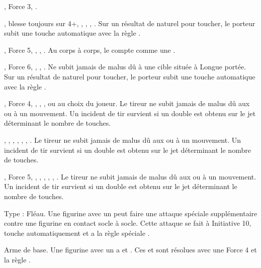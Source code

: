 \startitemlistonecol

\listitemonecol{\sling} , Force 3, \quicktofire{}.

\listitemonecol{\gasglobe} , blesse toujours sur 4+, \magicalattacks{}, , \volleyfire{}, \quicktofire{}. Sur un résultat de  naturel pour toucher, le porteur subit une touche automatique avec la règle \toxicattacks{}.

\listitemonecol{\ratlockpistol} , Force 5, \magicalattacks{}, , \quicktofire{}. Au corps à corps, le \ratlockpistol compte comme une \pw.

\listitemonecol{\jezail} , Force 6, \magicalattacks{}, \unwieldy{}, . Ne subit jamais de malus dû à une cible située à Longue portée. Sur un résultat de  naturel pour toucher, le porteur subit une touche automatique avec la règle \toxicattacks{}.

\listitemonecol{\rotarygun} , Force 4, \magicalattacks{}, \volatile{}, \reload{},  ou  au choix du joueur. Le tireur ne subit jamais de malus dû aux \multipleshots{} ou à un mouvement. Un incident de tir survient si un double est obtenu sur le jet déterminant le nombre de touches.

\listitemonecol{\globelauncher} , \toxicattacks{}, \magicalattacks{}, \volatile{}, \reload{}, \volleyfire{}, . Le tireur ne subit jamais de malus dû aux \multipleshots{} ou à un mouvement. Un incident de tir survient si un double est obtenu sur le jet déterminant le nombre de touches.

\listitemonecol{\naphthathrower} , Force 5,  \flamingattacks{}, \magicalattacks{}, , \volatile{}, \reload{}, . Le tireur ne subit jamais de malus dû aux \multipleshots{} ou à un mouvement. Un incident de tir survient si un double est obtenu sur le jet déterminant le nombre de touches.

\listitemonecol{\plagueflail} Type : Fléau. Une figurine avec un \plagueflail peut faire une attaque spéciale supplémentaire contre une figurine en contact socle à socle. Cette attaque se fait à Initiative 10, touche automatiquement et a la règle spéciale \toxicattacks{}.

\listitemonecol{\meatgrinder} Arme de base. Une figurine avec un \meatgrinder a  et . Ces \grindingattacks{} et \impacthits{} sont résolues avec une Force 4 et la règle .

